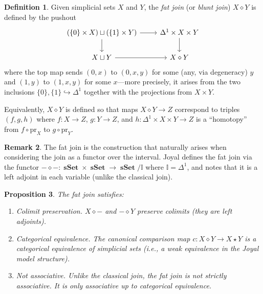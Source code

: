 \documentclass{article}
\newtheorem{proposition}{Proposition}
\theoremstyle{definition}
\newtheorem{definition}[proposition]{Definition}
\newtheorem{remark}[proposition]{Remark}
\newcommand{\I}{\mathbb{I}}
\DeclareMathOperator{\sSet}{\mathbf{sSet}}
\begin{document}
\begin{definition}\label{fat-join}
	Given simplicial sets $X$ and $Y$, the \emph{fat join} (or \emph{blunt join}) $X \diamond Y$ is defined by the pushout
	\[\begin{tikzcd}[ampersand replacement=\&]
		{(\{0\} \times X) \sqcup (\{1\} \times Y)} \& {\Delta^1 \times X \times Y} \\
		{X \sqcup Y} \& {X \diamond Y}
		\arrow[from=1-1, to=1-2]
		\arrow[from=1-1, to=2-1]
		\arrow[from=1-2, to=2-2]
		\arrow[from=2-1, to=2-2]
	\end{tikzcd}\]
	where the top map sends $(0, x)$ to $(0, x, y)$ for some (any, via degeneracy) $y$ and $(1, y)$ to $(1, x, y)$ for some $x$---more precisely, it arises from the two inclusions $\{0\}, \{1\} \hookrightarrow \Delta^1$ together with the projections from $X \times Y$.

	Equivalently, $X \diamond Y$ is defined so that maps $X \diamond Y \to Z$ correspond to triples $(f, g, h)$ where $f : X \to Z$, $g : Y \to Z$, and $h : \Delta^1 \times X \times Y \to Z$ is a ``homotopy'' from $f \circ \mathrm{pr}_X$ to $g \circ \mathrm{pr}_Y$.
\end{definition}

\begin{remark}
	The fat join is the construction that naturally arises when considering the join as a functor over the interval. Joyal defines the fat join via the functor $- \diamond - : \sSet \times \sSet \to \sSet / \I$ where $\I = \Delta^1$, and notes that it is a left adjoint in each variable (unlike the classical join).
\end{remark}

\begin{proposition}\label{fat-join-props}
	The fat join satisfies:
	\begin{enumerate}
		\item \emph{Colimit preservation.} $X \diamond -$ and $- \diamond Y$ preserve colimits (they are left adjoints).
		\item \emph{Categorical equivalence.} The canonical comparison map $c : X \diamond Y \to X \star Y$ is a categorical equivalence of simplicial sets (i.e., a weak equivalence in the Joyal model structure).
		\item \emph{Not associative.} Unlike the classical join, the fat join is not strictly associative. It is only associative up to categorical equivalence.
	\end{enumerate}
\end{proposition}
\end{document}
